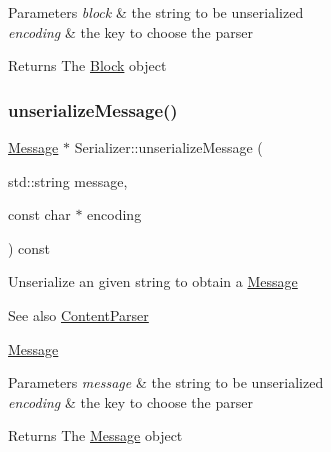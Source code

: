 \begin{DoxyParams}{Parameters}
{\em block} & the string to be unserialized \\
\hline
{\em encoding} & the key to choose the parser \\
\hline
\end{DoxyParams}
\begin{DoxyReturn}{Returns}
The \mbox{\hyperlink{classBlock}{Block}} object 
\end{DoxyReturn}
\mbox{\label{classSerializer_a1d16df9f35a7580da06a497dfbddffe8}} 
\subsubsection{\texorpdfstring{unserialize\+Message()}{unserializeMessage()}}
{\footnotesize\ttfamily \mbox{\hyperlink{classMessage}{Message}} $\ast$ Serializer\+::unserialize\+Message (\begin{DoxyParamCaption}\item[{std\+::string}]{message,  }\item[{const char $\ast$}]{encoding }\end{DoxyParamCaption}) const\hspace{0.3cm}{\ttfamily [virtual]}}

Unserialize an given string to obtain a \mbox{\hyperlink{classMessage}{Message}} \begin{DoxySeeAlso}{See also}
\mbox{\hyperlink{classContentParser}{Content\+Parser}} 

\mbox{\hyperlink{classMessage}{Message}}
\end{DoxySeeAlso}

\begin{DoxyParams}{Parameters}
{\em message} & the string to be unserialized \\
\hline
{\em encoding} & the key to choose the parser \\
\hline
\end{DoxyParams}
\begin{DoxyReturn}{Returns}
The \mbox{\hyperlink{classMessage}{Message}} object 
\end{DoxyReturn}
\mbox{\label{classSerializer_a64b858f0c2968e888cf796b6f09eed7b}} 
